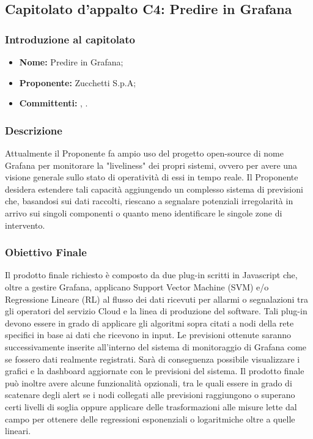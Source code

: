 \subsection{Capitolato d'appalto C4: Predire in Grafana}
	\subsubsection{Introduzione al capitolato}
	\begin{itemize}
		\item \textbf{Nome:} Predire in Grafana;
		\item \textbf{Proponente}\textbf{:} Zucchetti S.p.A;
		\item \textbf{Committenti}\textbf{:} \TV, \RC.
	\end{itemize}
	
	\subsubsection{Descrizione}
	Attualmente il Proponente fa ampio uso del progetto open-source di 	nome Grafana per monitorare la "liveliness" dei propri sistemi, ovvero per avere una visione generale sullo stato di operatività di essi in tempo reale. Il Proponente desidera estendere tali capacità aggiungendo un complesso sistema di previsioni che, basandosi sui dati raccolti, riescano a segnalare potenziali irregolarità in arrivo sui singoli componenti o quanto meno identificare le singole zone di intervento.
	
	\subsubsection{Obiettivo Finale}
	Il prodotto finale richiesto è composto da due plug-in scritti in Javascript che, oltre a gestire Grafana, applicano Support Vector Machine (SVM) e/o Regressione Lineare (RL) al flusso dei dati ricevuti per allarmi o segnalazioni tra gli operatori del servizio Cloud e la linea di produzione del software. Tali plug-in devono essere in grado di applicare gli algoritmi sopra citati a nodi della rete specifici in base ai dati che ricevono in input. Le previsioni ottenute saranno successivamente inserite all'interno del sistema di monitoraggio di Grafana come se fossero dati realmente registrati. Sarà di conseguenza possibile visualizzare i grafici e la dashboard aggiornate con le previsioni del sistema. Il prodotto finale può inoltre avere alcune funzionalità opzionali, tra le quali essere in grado di scatenare degli alert se i nodi collegati alle previsioni raggiungono o superano certi livelli di soglia oppure applicare delle trasformazioni alle misure lette dal campo per ottenere delle regressioni esponenziali o logaritmiche oltre a quelle lineari.
	

